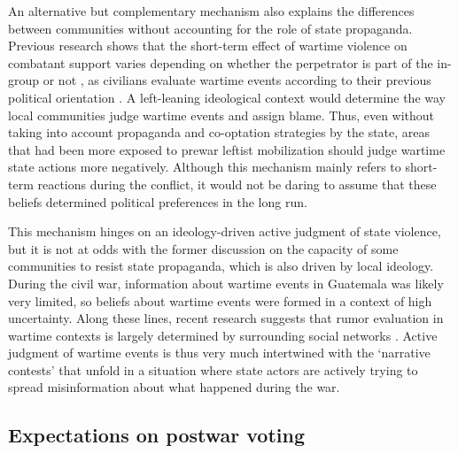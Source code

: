 \documentclass[12pt, notitlepage]{article}
\begin{document}
An alternative but complementary mechanism also explains the differences between communities without accounting for the role of state propaganda.
Previous research shows that the short-term effect of wartime violence on combatant support varies depending on whether the perpetrator is part of the in-group or not \citep{Lyall:2013aa}, as civilians evaluate wartime events according to their previous political orientation \citep{Pechenkina:2020ul, Silverman:2019aa}.
A left-leaning ideological context would determine the way local communities judge wartime events and assign blame.
Thus, even without taking into account propaganda and co-optation strategies by the state, areas that had been more exposed to prewar leftist mobilization should judge wartime state actions more negatively.
Although this mechanism mainly refers to short-term reactions during the conflict, it would not be daring to assume that these beliefs determined political preferences in the long run.

This mechanism hinges on an ideology-driven active judgment of state violence, but it is not at odds with the former discussion on the capacity of some communities to resist state propaganda, which is also driven by local ideology.
During the civil war, information about wartime events in Guatemala was likely very limited, so beliefs about wartime events were formed in a context of high uncertainty.
Along these lines, recent research suggests that rumor evaluation in wartime contexts is largely determined by surrounding social networks \citep{Schon:2021wf}.
Active judgment of wartime events is thus very much intertwined with the `narrative contests' that unfold in a situation where state actors are actively trying to spread misinformation about what happened during the war.


\subsection*{Expectations on postwar voting}

\end{document}

